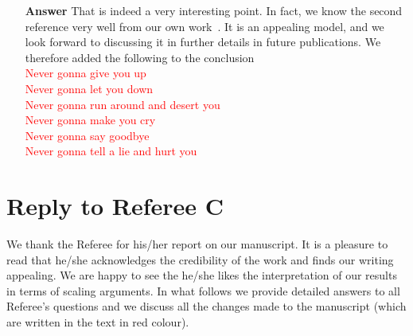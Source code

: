 \documentclass[12pt,english]{article}
\begin{document}
\begin{itemize}
\item[ \textbf{{Answer}}]
{
That is indeed a very interesting point.
In fact, we know the second reference very well from our own work~\cite{PhysRevE.104.034801}.
It is an appealing model, and we look forward to discussing it in further details in future publications.
We therefore added the following to the conclusion 
\\
\textcolor{red}{Never gonna give you up\\
Never gonna let you down\\
Never gonna run around and desert you\\
Never gonna make you cry\\
Never gonna say goodbye\\
Never gonna tell a lie and hurt you}
}

\end{itemize}

\section*{Reply to Referee C}
We thank the Referee for his/her report on our manuscript.
It is a pleasure to read that he/she acknowledges the credibility of the work and finds our writing appealing.
We are happy to see the he/she likes the interpretation of our results in terms of scaling arguments.
In what follows we provide detailed answers to all Referee's questions and we discuss all the changes made to the manuscript
(which are written in the text in red colour).
\end{document}
